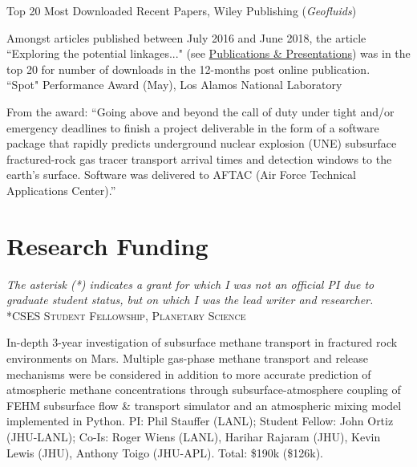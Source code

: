 \documentclass[11pt, letterpaper]{article}
\newcommand{\years}[1]{\marginnote{\scriptsize #1}}
\begin{document}
\years{2018}Top 20 Most Downloaded Recent Papers, Wiley Publishing (\emph{Geofluids})

	Amongst articles published between July 2016 and June 2018, the article
	``Exploring the potential linkages..." (see
	\hyperref[sec:pubs]{Publications \& Presentations}) was in the top 20 for
	number of downloads in the 12-months post online publication.\\

\years{2018}“Spot" Performance Award (May), Los Alamos National Laboratory

    From the award:
    ``Going above and beyond the call of duty under tight and/or emergency
    deadlines to finish a project deliverable in the form of a software package
    that rapidly predicts underground nuclear explosion (UNE) subsurface
    fractured-rock gas tracer transport arrival times and detection windows to
    the earth's surface. Software was delivered to AFTAC (Air Force Technical
    Applications Center).''

\section*{Research Funding}
\label{sec:funding}
\noindent
\emph{The asterisk (*) indicates a grant for which I was not an official PI due
to graduate student status, but on which I was the lead writer and researcher.}\\

\years{2021}\textsc{*CSES Student Fellowship, Planetary Science}

    In-depth 3-year investigation of subsurface methane transport in fractured
    rock environments on Mars. Multiple gas-phase methane transport and release
    mechanisms were be considered in addition to more accurate prediction of
    atmospheric methane concentrations through subsurface-atmosphere coupling
    of \textsc{FEHM} subsurface flow \& transport simulator and an atmospheric mixing model
    implemented in Python.
    PI: Phil Stauffer (LANL); Student Fellow: John Ortiz (JHU-LANL); Co-Is:
    Roger Wiens (LANL), Harihar Rajaram (JHU), Kevin Lewis (JHU), Anthony Toigo
    (JHU-APL). Total: \$190k (\$126k).\\
\end{document}
